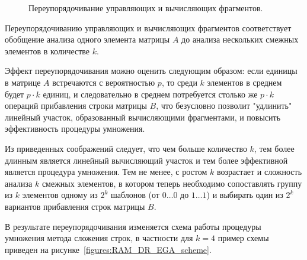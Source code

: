 \documentclass[a4paper,12pt]{report}
\begin{document}
\begin{figure}[h!]
	\caption{Переупорядочивание управляющих и вычисляющих фрагментов.}
	\label{figures:RAM_DR_SEA_reordering}
\end{figure}

Переупорядочиванию управляющих и вычисляющих фрагментов соответствует обобщение анализа одного элемента матрицы
$A$ до анализа нескольких смежных элементов в количестве $k$.

Эффект переупорядочивания можно оценить следующим образом: если единицы в матрице $A$ встречаются с вероятностью $p$,
то среди $k$ элементов в среднем будет $p \cdot k$ единиц, и следовательно в среднем потребуется столько же $p \cdot k$
операций прибавления строки матрицы $B$, что безусловно позволит "удлинить"{} линейный участок, образованный
вычисляющими фрагментами, и повысить эффективность процедуры умножения.

Из приведенных соображений следует, что чем больше количество $k$, тем более длинным является линейный вычисляющий
участок и тем более эффективной является процедура умножения. Тем не менее, с ростом $k$ возрастает и сложность анализа $k$ смежных
элементов, в котором теперь необходимо сопоставлять группу из $k$ элементов одному из $2^k$ шаблонов (от $0 \dots 0$ до $1 \dots 1$)
и выбирать один из $2^k$ вариантов прибавления строк матрицы $B$.

В результате переупорядочивания изменяется схема работы процедуры умножения метода сложения строк, в частности для $k=4$ пример схемы
приведен на рисунке~\ref{figures:RAM_DR_EGA_scheme}.
\end{document}
